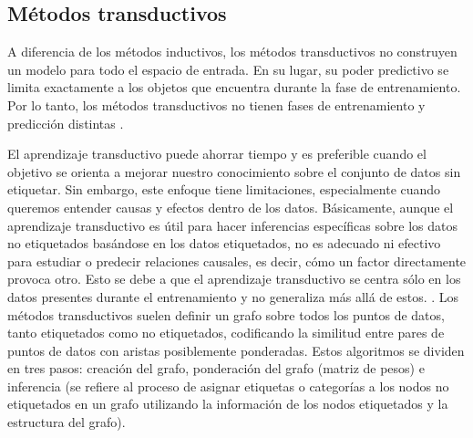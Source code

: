 \subsection{Métodos transductivos} \label{sec3:transductivo} %
A diferencia de los métodos inductivos, los métodos transductivos no construyen un modelo para todo el espacio de entrada. En su lugar, su poder predictivo se limita exactamente a los objetos que encuentra durante la fase de entrenamiento. Por lo tanto, los métodos transductivos no tienen fases de entrenamiento y predicción distintas \cite{Engelen:semi-supervised}.

El aprendizaje transductivo puede ahorrar tiempo y es preferible cuando el objetivo se orienta a mejorar nuestro conocimiento sobre el conjunto de datos sin etiquetar. Sin embargo, este enfoque tiene limitaciones, especialmente cuando queremos entender causas y efectos dentro de los datos. Básicamente, aunque el aprendizaje transductivo es útil para hacer inferencias específicas sobre los datos no etiquetados basándose en los datos etiquetados, no es adecuado ni efectivo para estudiar o predecir relaciones causales, es decir, cómo un factor directamente provoca otro. Esto se debe a que el aprendizaje transductivo se centra sólo en los datos presentes durante el entrenamiento y no generaliza más allá de estos. \cite{web:assumptions}.
Los métodos transductivos suelen definir un grafo sobre todos los puntos de datos, tanto etiquetados como no etiquetados, codificando la similitud entre pares de puntos de datos con aristas posiblemente ponderadas. Estos algoritmos se dividen en tres pasos: creación del grafo, ponderación del grafo (matriz de pesos) e inferencia (se refiere al proceso de asignar etiquetas o categorías a los nodos no etiquetados en un grafo utilizando la información de los nodos etiquetados y la estructura del grafo).
